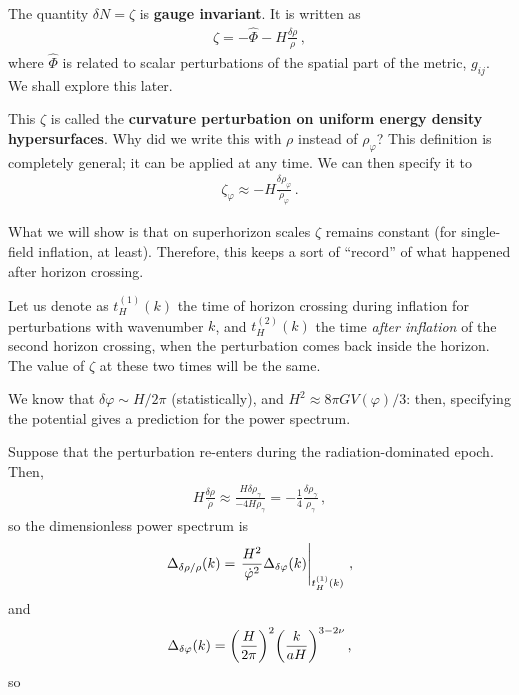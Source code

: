 \documentclass[main.tex]{subfiles}
\begin{document}
The quantity \(\delta N = \zeta\) is \textbf{gauge invariant}. It is written as 
%
\begin{align}
\zeta = - \hat{\Phi} - H \frac{ \delta \rho }{\rho }
\,,
\end{align}
%
where \(\hat{\Phi}\) is related to scalar perturbations  of the spatial part of the metric, \(g_{ij}\). We shall explore this later. 

This \(\zeta\) is called the \textbf{curvature perturbation on uniform energy density hypersurfaces}.
Why did we write this with \(\rho \) instead of \(\rho _\varphi \)? This definition is completely general; it can be applied at any time. 
We can then specify it to 
%
\begin{align}
\zeta_\varphi \approx - H \frac{ \delta \rho _\varphi }{\dot{\rho}_\varphi }
\,.
\end{align}

What we will show is that on superhorizon scales \(\zeta\) remains constant (for single-field inflation, at least). 
Therefore, this keeps a sort of ``record'' of what happened after horizon crossing.

Let us denote as \(t^{(1)}_H(k)\) the time of horizon crossing during inflation for perturbations with wavenumber \(k\), and \(t^{(2)}_H(k)\) the time \emph{after inflation} of the second horizon crossing, when the perturbation comes back inside the horizon.  
The value of \(\zeta \) at these two times will be the same.

We know that \(\delta \varphi \sim H / 2 \pi \) (statistically), and \(H^2 \approx 8 \pi G V(\varphi ) /3\): then, specifying the potential gives a prediction for the power spectrum. 

Suppose that the perturbation re-enters during the radiation-dominated epoch. Then, 
%
\begin{align}
H \frac{ \delta \rho }{\dot{\rho} } \approx \frac{H \delta \rho _\gamma }{-4 H \rho _\gamma } = - \frac{1}{4}\frac{ \delta \rho _\gamma }{\rho _\gamma }
\,,
\end{align}
%
so the dimensionless power spectrum is 
%
\begin{align}
\Delta_{ \delta \rho / \rho } (k)= 
\eval{\frac{H^2}{ \dot{\varphi}^2} \Delta_{ \delta \varphi } (k)}_{t^{(1)}_H (k)} 
\,,
\end{align}
%
and 
%
\begin{align}
\Delta_{ \delta \varphi } (k) = \qty( \frac{H}{ 2 \pi })^2 \qty(\frac{k}{aH})^{3-2 \nu }
\,,
\end{align}
%
so 

\end{document}
